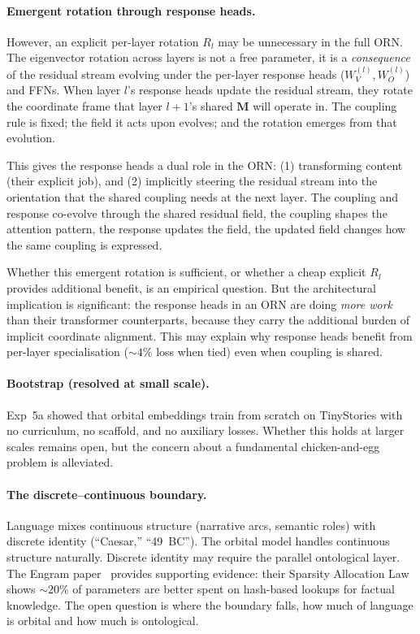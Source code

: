 \documentclass[11pt, a4paper]{article}
\newcommand{\M}{\mathbf{M}}
\theoremstyle{remark}
\begin{document}
\paragraph{Emergent rotation through response heads.}
However, an explicit per-layer rotation $R_l$ may be unnecessary in the full ORN.
The eigenvector rotation across layers is not a free parameter, it is a \emph{consequence} of the residual stream evolving under the per-layer response heads ($W_V^{(l)}, W_O^{(l)}$) and FFNs.
When layer $l$'s response heads update the residual stream, they rotate the coordinate frame that layer $l{+}1$'s shared $\M$ will operate in.
The coupling rule is fixed; the field it acts upon evolves; and the rotation emerges from that evolution.

This gives the response heads a dual role in the ORN: (1) transforming content (their explicit job), and (2) implicitly steering the residual stream into the orientation that the shared coupling needs at the next layer.
The coupling and response co-evolve through the shared residual field, the coupling shapes the attention pattern, the response updates the field, the updated field changes how the same coupling is expressed.

Whether this emergent rotation is sufficient, or whether a cheap explicit $R_l$ provides additional benefit, is an empirical question.
But the architectural implication is significant: the response heads in an ORN are doing \emph{more work} than their transformer counterparts, because they carry the additional burden of implicit coordinate alignment.
This may explain why response heads benefit from per-layer specialisation (${\sim}4\%$ loss when tied) even when coupling is shared.

\paragraph{Bootstrap (resolved at small scale).}
Exp~5a showed that orbital embeddings train from scratch on TinyStories with no curriculum, no scaffold, and no auxiliary losses.
Whether this holds at larger scales remains open, but the concern about a fundamental chicken-and-egg problem is alleviated.

\paragraph{The discrete--continuous boundary.}
Language mixes continuous structure (narrative arcs, semantic roles) with discrete identity (``Caesar,'' ``49~BC'').
The orbital model handles continuous structure naturally.
Discrete identity may require the parallel ontological layer.
The Engram paper~\cite{engram2026} provides supporting evidence: their Sparsity Allocation Law shows $\sim$20\% of parameters are better spent on hash-based lookups for factual knowledge.
The open question is where the boundary falls, how much of language is orbital and how much is ontological.
\end{document}
